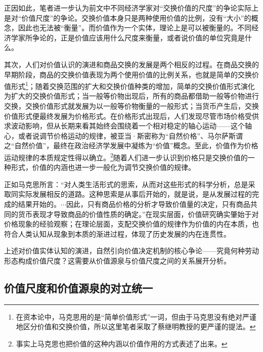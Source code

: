 正因如此，笔者进一步认为前文中不同经济学家对“交换价值的尺度”的争论实际上是对“价值尺度”的争论。交换价值本身只是两种使用价值的比例，没有“大小”的概念，因此也无法被“衡量”。而价值作为一个实体，理论上是可以被衡量的。不同经济学家所争论的，正是价值应该用什么尺度来衡量，或者说价值的单位究竟是什么。

其次，人们对价值认识的演进和商品交换的发展是两个相反的过程。在商品交换的早期阶段，商品的交换价值表现为两个使用价值的比例关系\cite[49]{ZhongGongZhongYangMaKeSiEnGeSiLieNingSiDaLinZhuZuoBianYiJuMaKeSiEnGeSiWenJiDi5Juan2009}，也就是简单的交换价值形式\footnote{在资本论中，马克思用的是“简单价值形式”一词，但由于马克思没有绝对严谨地区分价值和交换价值\cite[37]{ZhongGongZhongYangMaKeSiEnGeSiLieNingSiDaLinZhuZuoBianYiJuMaKeSiEnGeSiWenJiDi8Juan2009}，所以这里笔者采取了蔡继明教授的更严谨的提法\cite[145]{CaiJiMingJieZhiZhengLunHuiGuYuZhanWang2008}。}；随着交换范围的扩大和交换价值种类的增加，简单的交换价值形式演化为扩大的交换价值形式；当一般等价物出现后，所有的商品都借助一般等价物进行交换，交换价值形式就发展为以一般等价物衡量的一般形式；当货币产生后，交换价值形式便最终发展为价格形式。在价格形式出现后，人们发现尽管市场价格受供求波动影响，但从长期来看其始终会围绕着一个相对稳定的轴心运动——这个轴心，或者说调节价格运动的规律，被亚当·斯密称为“自然价格”、马尔萨斯谓之“自然价值”，最终在政治经济学发展中凝练为“价值”概念。至此，价值作为价格运动规律的本质规定性得以确立。\cite[145]{CaiJiMingJieZhiZhengLunHuiGuYuZhanWang2008}\footnote{事实上马克思也把价值的这种内涵以价值作用的方式表述了出来\cite[199]{ZhongGongZhongYangMaKeSiEnGeSiLieNingSiDaLinZhuZuoBianYiJuMaKeSiEnGeSiWenJiDi7Juan2009}。}随着人们进一步认识到价格只是交换价值的一种形式，价值的内涵也进一步一般化为调节交换价值的规律。

正如马克思所言：“对人类生活形式的思索，从而对这些形式的科学分析，总是采取同实际发展相反的道路。这种思索是从事后开始的，就是说，是从发展过程的完成的结果开始的。$\cdots$因此，只有商品价格的分析才导致价值量的决定，只有商品共同的货币表现才导致商品的价值性质的确定。”\cite[93]{ZhongGongZhongYangMaKeSiEnGeSiLieNingSiDaLinZhuZuoBianYiJuMaKeSiEnGeSiWenJiDi5Juan2009}在现实层面，价值研究确实肇始于对价格现象的经验观察；在理论层面，支配交换价值的规律作为价值的内在本质，也符合人类认知从现象到本质的渐进过程，体现了历史发展的内在连贯性。

上述对价值实体认知的演进，自然引向价值决定机制的核心争论——究竟何种劳动形态构成价值尺度？这需要从价值源泉与价值尺度之间的关系展开分析。

\subsection{价值尺度和价值源泉的对立统一}

